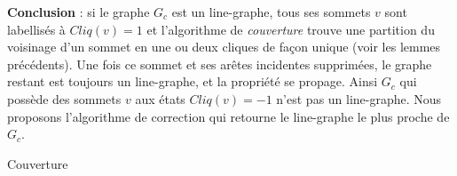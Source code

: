 {\bf Conclusion} : si le graphe $G_c$ est un line-graphe, tous ses sommets $v$ sont labellis\'es \`a $Cliq(v) = 1$ et l'algorithme  de {\em couverture} trouve une partition du voisinage d'un sommet en une ou deux cliques de fa\c con unique (voir les lemmes pr\'ec\'edents). 
Une fois ce sommet et ses ar\^etes incidentes supprim\'ees, le graphe restant est toujours un line-graphe, et la propri\'et\'e se propage.
Ainsi $G_c$ qui poss\`ede des sommets $v$ aux \'etats $Cliq(v) = -1$ n'est pas un line-graphe. Nous proposons l'algorithme de correction qui retourne le line-graphe le plus proche de $G_c$.


\begin{algorithm}
\caption{Couverture}
\label{algo:couverture}
\begin{algorithmic}[1]
\ELSE
			\ELSE
				\ELSE
				\ENDIF
			\ENDIF
					\ELSE
						\ENDIF	
					\ENDIF
				\ELSE
					\ELSE
						\ENDIF
					\ENDIF
				\ENDIF
			\ENDFOR
		\ELSE
		\ENDIF
	\ENDWHILE
\ENDIF
\end{algorithmic}
\end{algorithm}
%
